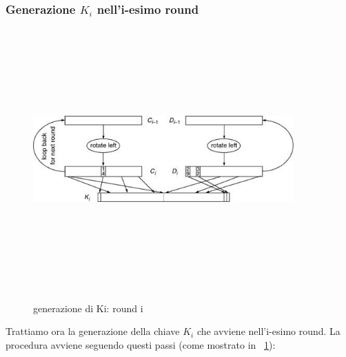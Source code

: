 \subsubsection{Generazione $K_{i}$ nell'i-esimo round}
\begin{figure}[htbp]
	\centering%
	\subfigure%
	{\includegraphics[height=10cm, width=10cm, keepaspectratio]{Immagini/Capitolo2/round_i.png}}
	\caption{generazione di Ki: round i \label{fig:round_i}} 	
\end{figure}
Trattiamo ora la generazione della chiave $K_{i}$ che avviene nell'i-esimo round. La procedura avviene seguendo questi passi (come mostrato in \figurename ~\ref{fig:round_i}):
